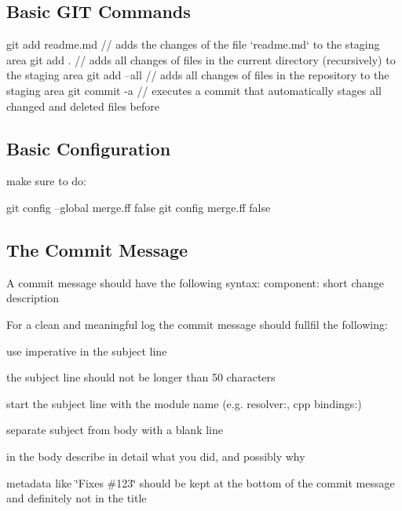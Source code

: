 \subsection*{Basic G\+I\+T Commands}

\begin{DoxyVerb}    git add readme.md   // adds the changes of the file `readme.md` to the staging area
    git add .           // adds all changes of files in the current directory (recursively) to the staging area
    git add --all       // adds all changes of files in the repository to the staging area
    git commit -a       // executes a commit that automatically stages all changed and deleted files before
\end{DoxyVerb}


\subsection*{Basic Configuration}

make sure to do\+: \begin{DoxyVerb}    git config --global merge.ff false
    git config merge.ff false
\end{DoxyVerb}


\subsection*{The Commit Message}

A commit message should have the following syntax\+: {\ttfamily component\+: short change description}

For a clean and meaningful log the commit message should fullfil the following\+:


\begin{DoxyItemize}
\item use imperative in the subject line
\item the subject line should not be longer than 50 characters
\item start the subject line with the module name (e.\+g. resolver\+:, cpp bindings\+:)
\item separate subject from body with a blank line
\item in the body describe in detail what you did, and possibly why
\item metadata like \char`\"{}\+Fixes \#123\char`\"{} should be kept at the bottom of the commit message and definitely not in the title
\end{DoxyItemize}

